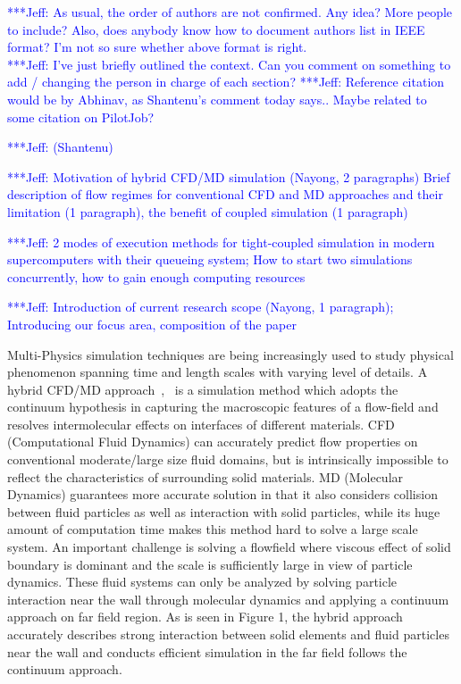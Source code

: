 \documentclass[times, 10pt,twocolumn]{article}
\newcommand{\skonote}[1]{ {\textcolor{blue} { ***Jeff: #1 }}}
\newcommand{\skonote}[1]{}
\begin{document}
\skonote{As usual, the order of authors are not confirmed. Any idea? More people to include? Also, does anybody know how to document authors list in IEEE format? I'm not so sure whether above format is right.}\\
\skonote{I've just briefly outlined the context. Can you comment on something to add / changing the person in charge of each section?}
\skonote{Reference citation would be by Abhinav, as Shantenu's comment today says.. Maybe related to some citation on PilotJob?}


 \skonote{(Shantenu)}

\skonote{Motivation of hybrid CFD/MD simulation (Nayong, 2 paragraphs)
Brief description of flow regimes for conventional CFD and MD approaches and their limitation (1 paragraph), the benefit of coupled simulation (1 paragraph)}

\skonote{2 modes of execution methods for tight-coupled simulation in modern supercomputers with their queueing system; How to start two simulations concurrently, how to gain enough computing resources}

\skonote{Introduction of current research scope (Nayong, 1 paragraph); Introducing our focus area, composition of the paper}

Multi-Physics simulation techniques are being increasingly used to study physical phenomenon spanning time and length scales with varying level of details.  A hybrid CFD/MD approach~\cite{Nie:2004},~\cite{Yen:2007} is a simulation method which adopts the continuum hypothesis in capturing the macroscopic features of a flow-field and resolves intermolecular effects on interfaces of different materials. CFD (Computational Fluid Dynamics) can accurately predict flow properties on conventional moderate/large size fluid domains, but is intrinsically impossible to reflect the characteristics of surrounding solid materials. MD (Molecular Dynamics) guarantees more accurate solution in that it also considers collision between fluid particles as well as interaction with solid particles, while its huge amount of computation time makes this method hard to solve a large scale system. An important challenge is solving a flowfield where viscous effect of solid boundary is dominant and the scale is sufficiently large in view of particle dynamics. These fluid systems can only be analyzed by solving particle interaction near the wall through molecular dynamics and applying a continuum approach on far field region. As is seen in Figure 1, the hybrid approach accurately describes strong interaction between solid elements and fluid particles near the wall and conducts efficient simulation in the far field follows the continuum approach.
\end{document}
